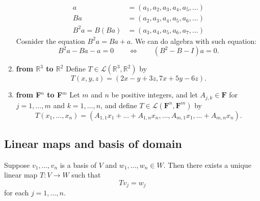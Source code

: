 \documentclass[11pt]{article}
\begin{document}
\begin{enumerate}
        \begin{align*}
            a &= (a_1, a_2, a_3, a_4, a_5, \dots) \\
            Ba &= (a_2, a_3, a_4, a_5, a_6, \dots) \\
            B^2 a = B(Ba) &= (a_3, a_4, a_5, a_6, a_7, \dots)
        \end{align*}
        Cosnider the equation \(B^2 a = Ba + a\). We can do algebra with such equation: \[B^2 a - Ba - a = 0 \qquad \Leftrightarrow \qquad (B^2 - B - I)a = 0.\]
        \item \textbf{from \(\mathbb{R}^3\) to \(\mathbb{R}^2\)} Define \(T \in \mathcal{L}(\mathbb{R}^3, \mathbb{R}^2)\) by \[T(x,y,z) = (2x-y + 3z, 7x + 5y - 6z).\]
        \item \textbf{from \textbf{F}\(^n\) to \textbf{F}\(^m\)} Let $m$ and $n$ be positive integers, and let \(A_{j,k} \in \textbf{F}\) for \(j = 1, \dots, m\) and \(k = 1, \dots, n\), and define \(T \in \mathcal{L}(\textbf{F}^n, \textbf{F}^m)\) by \[T(x_1, \dots, x_n) = (A_{1,1} x_1 + \dots + A_{1,n} x_n, \dots, A_{m,1} x_1, \dots + A_{m,n} x_n).\]
    \end{enumerate}

    \subsection{Linear maps and basis of domain}

    Suppose \(v_1, \dots, v_n\) is a basis of $V$  and \(w_1, \dots, w_n \in W\). Then there exists a unique linear map \(T:V \rightarrow W\) such that \[Tv_j = w_j\] for each \(j = 1, \dots, n\).
\end{document}
